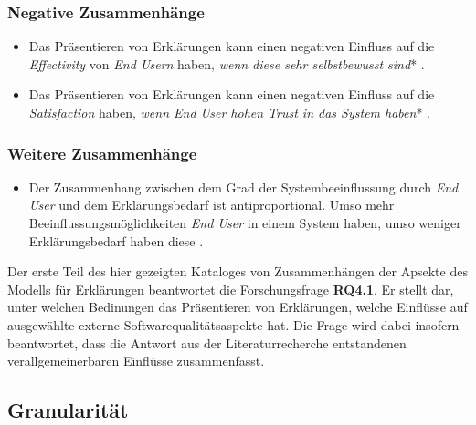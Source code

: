 \subsubsection*{Negative Zusammenhänge}

\begin{itemize}
    \item Das Präsentieren von Erklärungen kann einen negativen Einfluss auf die \textit{Effectivity} von \textit{End Usern} haben, \textit{wenn diese sehr selbstbewusst sind}* \cite{schaffer_i_2019}.
    \item Das Präsentieren von Erklärungen kann einen negativen Einfluss auf die \textit{Satisfaction} haben, \textit{wenn End User hohen Trust in das System haben}* \cite{rosenfeld_explainability_2019, doshi2017towards}.
\end{itemize}

\subsubsection*{Weitere Zusammenhänge}

\begin{itemize}
    \item Der Zusammenhang zwischen dem Grad der Systembeeinflussung durch \textit{End User} und dem Erklärungsbedarf ist antiproportional. Umso mehr Beeinflussungsmöglichkeiten \textit{End User} in einem System haben, umso weniger Erklärungsbedarf haben diese \cite{rosenfeld_explainability_2019}.
\end{itemize}

\smallskip

\noindent{}

\smallskip

Der erste Teil des hier gezeigten Kataloges von Zusammenhängen der Apsekte des Modells für Erklärungen beantwortet die Forschungsfrage \textbf{RQ4.1}. Er stellt dar, unter welchen Bedinungen das Präsentieren von Erklärungen, welche Einflüsse auf ausgewählte externe Softwarequalitätsaspekte hat. Die Frage wird dabei insofern beantwortet, dass die Antwort aus der Literaturrecherche entstandenen verallgemeinerbaren Einflüsse zusammenfasst. 

\subsection*{Granularität}


